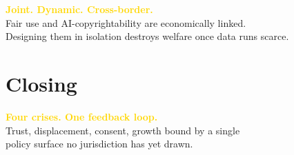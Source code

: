 \documentclass[aspectratio=169,11pt]{beamer}
\begin{document}
{
\begin{frame}[plain]
\vfill
\begin{center}
{\huge\bfseries\textcolor{Gold}{Joint. Dynamic. Cross-border.}}\\[0.8cm]
{\Large\textcolor{SoftWhite}{Fair use and AI-copyrightability are economically linked.}}\\[0.3cm]
{\Large\textcolor{SoftWhite}{Designing them in isolation \alert{destroys} welfare once data runs scarce.}}
\end{center}
\vfill
\end{frame}}


\section*{Closing}

{
\begin{frame}[plain]
\vfill
\begin{center}
{\Huge\bfseries\textcolor{Gold}{Four crises. One feedback loop.}}\\[0.8cm]
{\Large\textcolor{SoftWhite}{Trust, displacement, consent, growth \textemdash{} bound by a single}}\\[0.2cm]
{\Large\textcolor{SoftWhite}{policy surface no jurisdiction has yet drawn.}}
\end{center}
\vfill
\end{frame}}
\end{document}
